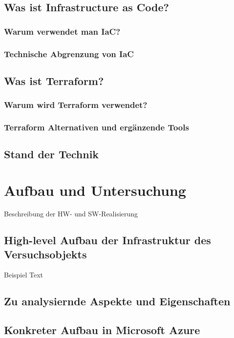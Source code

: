 \section{Was ist Infrastructure as Code?}

\subsection{Warum verwendet man IaC?}

\subsection{Technische Abgrenzung von IaC}

\section{Was ist Terraform?}

\subsection{Warum wird Terraform verwendet?}

\subsection{Terraform Alternativen und ergänzende Tools}

\section{Stand der Technik}

\chapter{Aufbau und Untersuchung}
\label{sec:real}
Beschreibung der HW- und SW-Realisierung

\section{High-level Aufbau der Infrastruktur des Versuchsobjekts}
\label{sec:real-unter}
Beispiel Text

\section{Zu analysiernde Aspekte und Eigenschaften}

\section{Konkreter Aufbau in Microsoft Azure}

